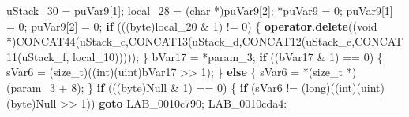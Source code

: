 \documentclass[
]{article}
\newenvironment{Shaded}{}{}
\newcommand{\ControlFlowTok}[1]{\textcolor[rgb]{0.00,0.44,0.13}{\textbf{#1}}}
\newcommand{\DataTypeTok}[1]{\textcolor[rgb]{0.56,0.13,0.00}{#1}}
\newcommand{\DecValTok}[1]{\textcolor[rgb]{0.25,0.63,0.44}{#1}}
\newcommand{\ExtensionTok}[1]{#1}
\newcommand{\KeywordTok}[1]{\textcolor[rgb]{0.00,0.44,0.13}{\textbf{#1}}}
\newcommand{\NormalTok}[1]{#1}
\newcommand{\OperatorTok}[1]{\textcolor[rgb]{0.40,0.40,0.40}{#1}}
\begin{document}
\begin{Shaded}
\begin{Highlighting}[]
\NormalTok{  uStack\_30 }\OperatorTok{=}\NormalTok{ puVar9}\OperatorTok{[}\DecValTok{1}\OperatorTok{];}
\NormalTok{  local\_28 }\OperatorTok{=} \OperatorTok{(}\DataTypeTok{char} \OperatorTok{*)}\NormalTok{puVar9}\OperatorTok{[}\DecValTok{2}\OperatorTok{];}
  \OperatorTok{*}\NormalTok{puVar9 }\OperatorTok{=} \DecValTok{0}\OperatorTok{;}
\NormalTok{  puVar9}\OperatorTok{[}\DecValTok{1}\OperatorTok{]} \OperatorTok{=} \DecValTok{0}\OperatorTok{;}
\NormalTok{  puVar9}\OperatorTok{[}\DecValTok{2}\OperatorTok{]} \OperatorTok{=} \DecValTok{0}\OperatorTok{;}
  \ControlFlowTok{if} \OperatorTok{(((}\NormalTok{byte}\OperatorTok{)}\NormalTok{local\_20 }\OperatorTok{\&} \DecValTok{1}\OperatorTok{)} \OperatorTok{!=} \DecValTok{0}\OperatorTok{)} \OperatorTok{\{}
    \KeywordTok{operator}\OperatorTok{.}\KeywordTok{delete}\OperatorTok{((}\DataTypeTok{void} \OperatorTok{*)}\NormalTok{CONCAT44}\OperatorTok{(}\NormalTok{uStack\_c}\OperatorTok{,}\NormalTok{CONCAT13}\OperatorTok{(}\NormalTok{uStack\_d}\OperatorTok{,}\NormalTok{CONCAT12}\OperatorTok{(}\NormalTok{uStack\_e}\OperatorTok{,}\NormalTok{CONCAT11}\OperatorTok{(}\NormalTok{uStack\_f}\OperatorTok{,}
\NormalTok{                                                  local\_10}\OperatorTok{)))));}
  \OperatorTok{\}}
\NormalTok{  bVar17 }\OperatorTok{=} \OperatorTok{*}\NormalTok{param\_3}\OperatorTok{;}
  \ControlFlowTok{if} \OperatorTok{((}\NormalTok{bVar17 }\OperatorTok{\&} \DecValTok{1}\OperatorTok{)} \OperatorTok{==} \DecValTok{0}\OperatorTok{)} \OperatorTok{\{}
\NormalTok{    sVar6 }\OperatorTok{=} \OperatorTok{(}\DataTypeTok{size\_t}\OperatorTok{)((}\DataTypeTok{int}\OperatorTok{)(}\ExtensionTok{uint}\OperatorTok{)}\NormalTok{bVar17 }\OperatorTok{\textgreater{}\textgreater{}} \DecValTok{1}\OperatorTok{);}
  \OperatorTok{\}}
  \ControlFlowTok{else} \OperatorTok{\{}
\NormalTok{    sVar6 }\OperatorTok{=} \OperatorTok{*(}\DataTypeTok{size\_t} \OperatorTok{*)(}\NormalTok{param\_3 }\OperatorTok{+} \DecValTok{8}\OperatorTok{);}
  \OperatorTok{\}}
  \ControlFlowTok{if} \OperatorTok{(((}\NormalTok{byte}\OperatorTok{)}\NormalTok{Null }\OperatorTok{\&} \DecValTok{1}\OperatorTok{)} \OperatorTok{==} \DecValTok{0}\OperatorTok{)} \OperatorTok{\{}
    \ControlFlowTok{if} \OperatorTok{(}\NormalTok{sVar6 }\OperatorTok{!=} \OperatorTok{(}\DataTypeTok{long}\OperatorTok{)((}\DataTypeTok{int}\OperatorTok{)(}\ExtensionTok{uint}\OperatorTok{)(}\NormalTok{byte}\OperatorTok{)}\NormalTok{Null }\OperatorTok{\textgreater{}\textgreater{}} \DecValTok{1}\OperatorTok{))} \ControlFlowTok{goto}\NormalTok{ LAB\_0010c790}\OperatorTok{;}
\NormalTok{LAB\_0010cda4}\OperatorTok{:}

\end{Highlighting}
\end{Shaded}
\end{document}

